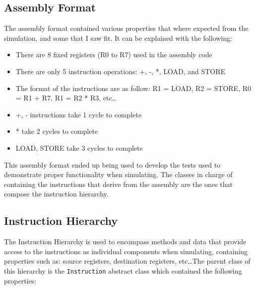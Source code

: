 \documentclass{article}
\begin{document}
\subsection{Assembly Format}
The assembly format contained various properties that where expected from the simulation, and some that I saw fit. It can be explained with the following:

\begin{itemize}
    \item There are 8 fixed registers (R0 to R7) used in the assembly code
    \item There are only 5 instruction operations: +, -, *, LOAD, and STORE
    \item The format of the instructions are as follow: R1 = LOAD, R2 = STORE, R0 = R1 + R7, R1 = R2 * R3, etc\ldots
    \item +, - instructions take 1 cycle to complete
    \item * take 2 cycles to complete 
    \item LOAD, STORE take 3 cycles to complete
\end{itemize}

This assembly format ended up being used to develop the tests used to demonstrate proper functionality when simulating. The classes in charge of containing the instructions that derive from the assembly are the ones that compose the instruction hierarchy.

\subsection{Instruction Hierarchy}
The Instruction Hierarchy is used to encompass methods and data that provide access to the instructions as individual components when simulating, containing properties such as: source registers, destination registers, etc\ldots The parent class of this hierarchy is the \lstinline|Instruction| abstract class which contained the following properties:
\end{document}

